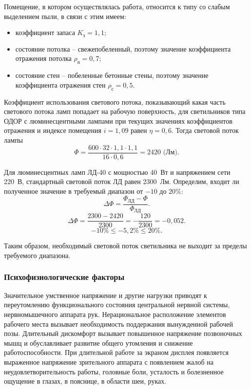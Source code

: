 Помещение, в котором осуществлялась работа, относится к типу со слабым выделением пыли, в связи с этим имеем:
\begin{itemize}
    \item коэффициент запаса $K_\text{з} = 1,1$;
    \item состояние потолка -- свежепобеленный, поэтому значение коэффициента отражения потолка $\rho_\text{п} = 0,7$;
    \item состояние стен -- побеленные бетонные стены, поэтому значение коэффициента отражения стен $\rho_\text{с} = 0,5$.
\end{itemize}

Коэффициент использования светового потока, показывающий какая часть светового потока ламп попадает на рабочую поверхность, для светильников типа ОДОР с люминесцентными лампами при текущих значениях коэффициентов отражения и индексе помещения $i = 1,09$ равен $\eta = 0,6$.
Тогда световой поток лампы
$$\Phi = \frac{600 \cdot 32 \cdot 1,1 \cdot 1,1}{16 \cdot 0,6} = 2420 \text{ (Лм)}.$$

Для люминесцентных ламп ЛД-40 с мощностью 40~Вт и напряжением сети 220~В, стандартный световой поток ЛД равен 2300~Лм.
Определим, входит ли полученное значение в требуемый диапазон от $-10$ до $20\%$:
\begin{equation}
    \Delta\Phi = \frac{\Phi_\text{ЛД} - \Phi}{\Phi_\text{ЛД}}.
\end{equation}
$$\Delta\Phi = \frac{2300 - 2420}{2300} = -\frac{120}{2300} = -0,052.$$
$$-10\% \le -5,2\% \le 20\%.$$

Таким образом, необходимый световой поток светильника не выходит за пределы требуемого диапазона.


\subsubsection{Психофизиологические факторы}

Значительное умственное напряжение и другие нагрузки приводят к переутомлению функционального состояния центральной нервной системы, нервно\-мышечного аппарата рук. 
Нерациональное расположение элементов рабочего места вызывает необходимость поддержания вынужденной рабочей позы. 
Длительный дискомфорт вызывает повышенное напряжение позвоночных мышц и обуславливает развитие общего утомления и снижение работоспособности.
При длительной работе за экраном дисплея появляется выраженное напряжение зрительного аппарата с появлением жалоб на неудовлетворительность работы, головные боли, усталость и болезненное ощущение в глазах, в пояснице, в области шеи, руках.

